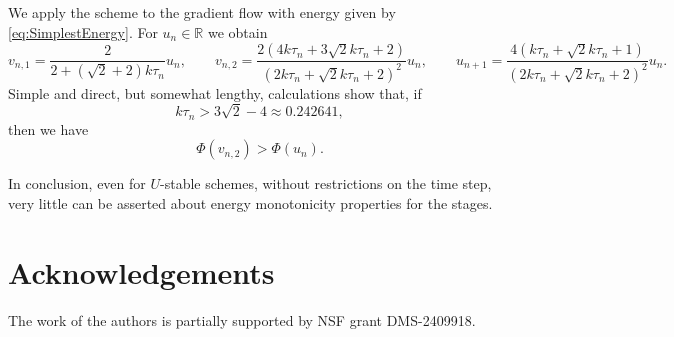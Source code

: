 \documentclass{amsart}
\newcommand{\Real}{\mathbb{R}}
\theoremstyle{definition}
\begin{document}
We apply the scheme to the gradient flow with energy given by \eqref{eq:SimplestEnergy}. For $u_n \in \Real$ we obtain
\[
  v_{n,1} = \frac{2}{ 2 + \left(\sqrt{2}+2\right) k\tau_n } u_n,
  \qquad
  v_{n,2} = \frac{2  \left(4 k \tau_n +3 \sqrt{2} k \tau_n +2\right)}{\left(2 k \tau_n +\sqrt{2} k \tau_n +2\right)^2} u_n,
  \qquad
  u_{n+1} = \frac{4  \left(k \tau_n +\sqrt{2} k \tau_n +1\right)}{\left(2 k \tau_n +\sqrt{2} k \tau_n +2\right)^2} u_n.
\]
Simple and direct, but somewhat lengthy, calculations show that, if
\[
  k \tau_n > 3\sqrt{2}-4 \approx 0.242641,
\]
then we have 
\[
  \Phi(v_{n,2}) > \Phi(u_n).
\]

In conclusion, even for $U$-stable schemes, without restrictions on the time step, very little can be asserted about energy monotonicity properties for the stages.

\section*{Acknowledgements}

The work of the authors is partially supported by NSF grant DMS-2409918.



\end{document}
